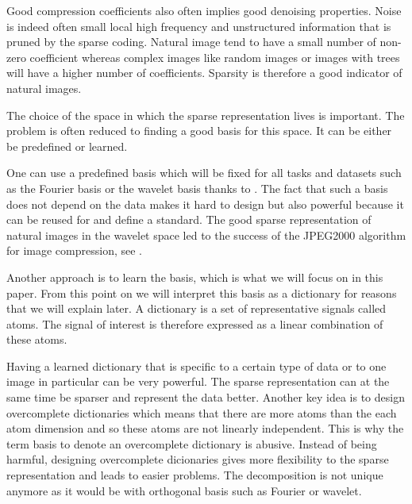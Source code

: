 \documentclass[a4paper,11pt]{article}
\begin{document}
Good compression coefficients also often implies good denoising properties.
Noise is indeed often small local high frequency and unstructured information that is pruned by the sparse coding.
Natural image tend to have a small number of non-zero coefficient whereas complex images like random images or images with trees will have a higher number of coefficients.
Sparsity is therefore a good indicator of natural images.

The choice of the space in which the sparse representation lives is important.
The problem is often reduced to finding a good basis for this space.
It can be either be predefined or learned.

One can use a predefined basis which will be fixed for all tasks and datasets such as the Fourier basis or the wavelet basis thanks to \cite{mallat99}.
The fact that such a basis does not depend on the data makes it hard to design but also powerful because it can be reused for and define a standard.
The good sparse representation of natural images in the wavelet space led to the success of the JPEG2000 algorithm for image compression, see \cite{marcellin00}.

Another approach is to learn the basis, which is what we will focus on in this paper.
From this point on we will interpret this basis as a dictionary for reasons that we will explain later.
A dictionary is a set of representative signals called atoms.
The signal of interest is therefore expressed as a linear combination of these atoms.

Having a learned dictionary that is specific to a certain type of data or to one image in particular can be very powerful.
The sparse representation can at the same time be sparser and represent the data better.
Another key idea is to design overcomplete dictionaries which means that there are more atoms than the each atom dimension and so these atoms are not linearly independent.
This is why the term basis to denote an overcomplete dictionary is abusive.
Instead of being harmful, designing overcomplete dicionaries gives more flexibility to the sparse representation and leads to easier problems.
The decomposition is not unique anymore as it would be with orthogonal basis such as Fourier or wavelet.
\end{document}
